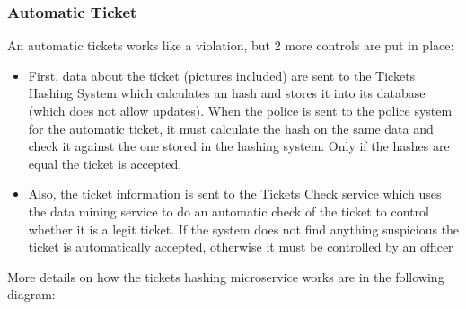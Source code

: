 \subsubsection{Automatic Ticket}
An automatic tickets works like a violation, but 2 more controls are put in place:
\begin{itemize}
    \item First, data about the ticket (pictures included) are sent to the Tickets Hashing System which calculates an hash and stores it into its database (which does not allow updates). When the police is sent to the police system for the automatic ticket, it must calculate the hash on the same data and check it against the one stored in the hashing system. Only if the hashes are equal the ticket is accepted.
    \item Also, the ticket information is sent to the Tickets Check service which uses the data mining service to do an automatic check of the ticket to control whether it is a legit ticket. If the system does not find anything suspicious the ticket is automatically accepted, otherwise it must be controlled by an officer
\end{itemize}


More details on how the tickets hashing microservice works are in the following diagram:

